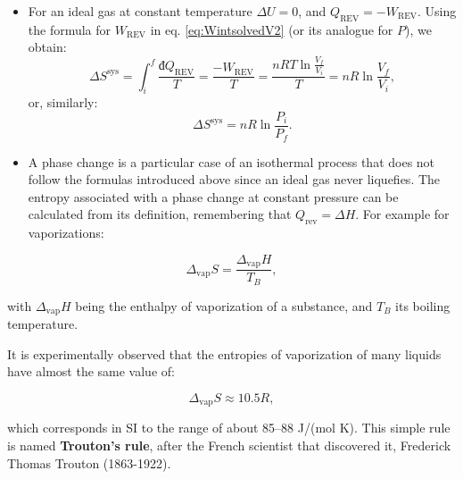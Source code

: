 \documentclass[
  9pt,
]{extbook}
\theoremstyle{definition}
\theoremstyle{definition}
\theoremstyle{definition}
\theoremstyle{remark}
\begin{document}
\begin{itemize}
\item
  For an ideal gas at constant temperature \(\Delta U =0\), and \(Q_{\mathrm{REV}} = -W_{\mathrm{REV}}\). Using the formula for \(W_{\mathrm{REV}}\) in eq. \eqref{eq:WintsolvedV2} (or its analogue for \(P\)), we obtain:
  \begin{equation}
  \Delta S^{\mathrm{sys}} = \int_i^f \frac{đQ_{\mathrm{REV}}}{T} = \frac{-W_{\mathrm{REV}}}{T} = \frac{nRT \ln \frac{V_f}{V_i}}{T} = nR \ln \frac{V_f}{V_i},
  \label{eq:sigconsttV}
  \end{equation}
  or, similarly:
  \begin{equation}
  \Delta S^{\mathrm{sys}} = nR \ln \frac{P_i}{P_f}.
  \label{eq:sigconsttP}
  \end{equation}
\item
  A phase change is a particular case of an isothermal process that does not follow the formulas introduced above since an ideal gas never liquefies. The entropy associated with a phase change at constant pressure can be calculated from its definition, remembering that \(Q_{\mathrm{rev}}= \Delta H\). For example for vaporizations:
\end{itemize}

\begin{equation}
\Delta_{\mathrm{vap}} S = \frac{\Delta_{\mathrm{vap}}H}{T_B},
\label{eq:spc}
\end{equation}

with \(\Delta_{\mathrm{vap}}H\) being the enthalpy of vaporization of a substance, and \(T_B\) its boiling temperature.

It is experimentally observed that the entropies of vaporization of many liquids have almost the same value of:

\begin{equation}
\Delta_{\mathrm{vap}} S \approx 10.5 R,
\label{eq:trouton}
\end{equation}

which corresponds in SI to the range of about 85--88 J/(mol K). This simple rule is named \textbf{Trouton's rule}, after the French scientist that discovered it, Frederick Thomas Trouton (1863-1922).
\end{document}
